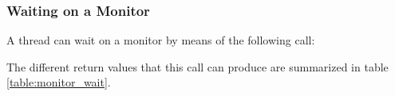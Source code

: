 
\subsubsection{Waiting on a Monitor}

A thread can wait on a monitor by means of the following call:


The different return values that this call can produce are summarized
in table \ref{table:monitor_wait}.  



